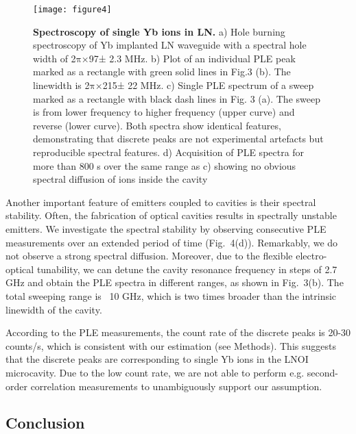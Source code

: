 \documentclass[prl,reprint,superscriptaddress]{revtex4-1}
\begin{document}
  \begin{figure}
\texttt{[image: figure4]}%
\caption{ \textbf{Spectroscopy of single Yb ions in LN.} a) Hole burning spectroscopy of Yb implanted LN  waveguide with a spectral hole width of 2$\mathrm{\pi}$×97± 2.3 MHz. b) Plot of an individual PLE peak marked as a rectangle with green solid lines in Fig.3 (b). The linewidth is 2$\mathrm{\pi}$×215± 22 MHz. c) Single PLE spectrum of a sweep marked as a rectangle with black dash lines in Fig. 3 (a). The sweep is from lower frequency to higher frequency (upper curve) and reverse (lower curve). Both spectra show  identical features, demonstrating that discrete peaks are not experimental artefacts but reproducible spectral features. d) Acquisition of PLE spectra for more than 800 s over the same range as c) showing no obvious spectral diffusion of ions inside the cavity \label{figure4}}
\end{figure}  

Another important feature of emitters coupled to cavities is their spectral stability. Often, the fabrication of optical cavities results in spectrally unstable  emitters. We investigate the spectral stability by observing consecutive PLE measurements over an extended period of time (Fig.~4(d)). Remarkably, we do not observe a strong spectral diffusion. Moreover, due to the flexible electro-optical tunability, we can detune the cavity resonance frequency in steps of 2.7 GHz and obtain the PLE spectra in different ranges, as shown in Fig.~3(b). The total sweeping range is ~10 GHz, which is two times broader than the intrinsic linewidth of the cavity.  

According to the PLE measurements, the count rate of the discrete peaks is 20-30 counts/s, which is consistent with our estimation (see Methods). This suggests that the discrete peaks are corresponding to single Yb ions in the LNOI microcavity. Due to the low count rate, we are not able to perform e.g. second-order correlation measurements to unambiguously support our assumption.

\subsection{Conclusion}
\end{document}

